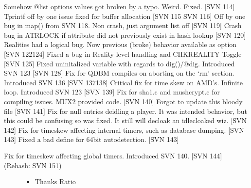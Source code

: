 \documentclass[letterpaper,10pt,english]{sphinxmanual}
\begin{document}
\sphinxAtStartPar
Somehow @list options values got broken by a typo.  Weird.  Fixed. {[}SVN 114{]}
Tprintf off by one issue fixed for buffer allocation {[}SVN 115 \sphinxhyphen{} SVN 116{]}
Off by one bug in map() from SVN 118.  Non crash, just argument list off {[}SVN 119{]}
Crash bug in ATRLOCK if attribute did not previously exist in hash lookup {[}SVN 120{]}
Realities had a logical bug.  Now previous (broke) behavior available as option {[}SVN 122\sphinxhyphen{}124{]}
Fixed a bug in Reality level handling and CHKREALITY Toggle {[}SVN 125{]}
Fixed uninitalized variable with regards to dig()/@dig.  Introduced SVN 123 {[}SVN 128{]}
Fix for QDBM compiles on aborting on the ‘rm’ section.  Introduced SVN 136 {[}SVN 137\sphinxhyphen{}138{]}
Critical fix for time skew on AMD’s.  Infinite loop.  Introduced SVN 123 {[}SVN 139{]}
Fix for sha1.c and mushcrypt.c for compiling issues.  MUX2 provided code.  {[}SVN 140{]}
Forgot to update this bloody file {[}SVN 141{]}
Fix for null entries deidling a player.  It was intended behavior, but this could be confusing so was fixed.  It still will de\sphinxhyphen{}cloak an idle\sphinxhyphen{}cloaked wiz. {[}SVN 142{]}
Fix for timeskew affecting internal timers, such as database dumping. {[}SVN 143{]}
Fixed a bad define for 64\sphinxhyphen{}bit autodetection. {[}SVN 143{]}
\begin{description}
\item[{Fix for timeskew affecting global timers. Introduced SVN 140. {[}SVN 144{]} (Rehash: SVN 151)}] \leavevmode\begin{itemize}
\item {} 
\sphinxAtStartPar
Thanks Ratio

\end{itemize}

\end{description}
\end{document}
